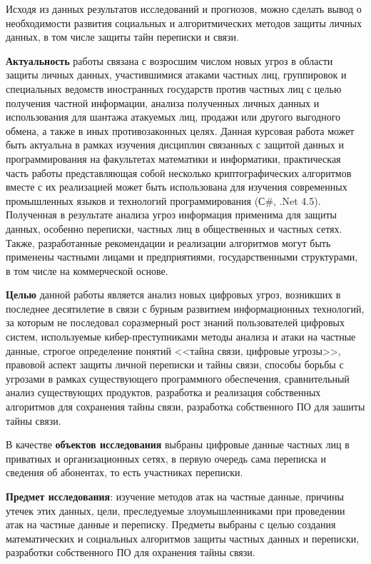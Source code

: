 Исходя из данных результатов исследований и прогнозов, можно сделать вывод о необходимости развития социальных  и алгоритмических  методов защиты личных данных, в том числе защиты тайн переписки и  связи.   

\textbf{Актуальность} работы  связана с возросшим числом новых угроз в области защиты личных данных, участившимися атаками частных лиц, группировок и специальных ведомств иностранных государств против частных лиц с целью получения частной информации, анализа полученных личных данных   и использования для шантажа атакуемых лиц, продажи или другого выгодного обмена, а также  в иных противозаконных целях. Данная курсовая работа может быть актуальна в рамках изучения дисциплин связанных с защитой данных и программирования на факультетах математики и информатики, практическая часть работы представляющая собой несколько криптографических алгоритмов вместе с их реализацией может быть использована для изучения современных промышленных языков и технологий программирования (С\#, .Net 4.5). Полученная в результате анализа угроз информация применима для защиты   данных, особенно переписки, частных лиц в общественных и частных сетях. Также, разработанные рекомендации и реализации алгоритмов могут быть применены частными лицами и предприятиями, государственными структурами, в том числе на коммерческой основе. 

\textbf{Целью} данной работы является %
 анализ новых цифровых угроз, возникших в последнее десятилетие в связи с бурным развитием информационных технологий, за которым не последовал соразмерный рост знаний пользователей цифровых систем, используемые кибер-преступниками методы анализа и атаки на частные данные, строгое определение понятий <<тайна связи, цифровые угрозы>>, правовой аспект защиты личной переписки и тайны связи, способы борьбы с угрозами  в рамках существующего программного обеспечения, %
 сравнительный анализ существующих продуктов, разработка и реализация собственных алгоритмов для сохранения тайны связи, разработка собственного ПО для зашиты тайны связи.	
 
 В качестве \textbf{объектов исследования} выбраны цифровые данные частных лиц в приватных и организационных сетях, в первую очередь сама  переписка и сведения об абонентах, то есть участниках переписки.
 
 \textbf{Предмет исследования}: изучение методов атак на частные данные, причины утечек этих данных, цели, преследуемые злоумышленниками при проведении атак на частные данные и переписку. Предметы выбраны  с целью создания математических и социальных алгоритмов защиты частных данных и переписки, разработки собственного ПО для охранения тайны связи.
 \newpage %
